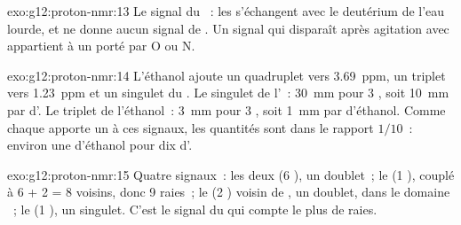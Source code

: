 \begin{solution}{exo:g12:proton-nmr:13}
Le signal du ~: les   s'échangent avec le
deutérium de l'eau lourde, et  ne donne aucun signal de .
Un signal qui disparaît après agitation avec  appartient à un
 porté par O ou N.
\end{solution}

\begin{solution}{exo:g12:proton-nmr:14}
L'éthanol ajoute un quadruplet vers \qty{3.69}{ppm}, un triplet vers
\qty{1.23}{ppm} et un singulet du . Le singulet de l'~:
\qty{30}{mm} pour 3 , soit \qty{10}{mm} par  d'. Le
triplet de l'éthanol~: \qty{3}{mm} pour 3 , soit \qty{1}{mm} par
 d'éthanol. Comme chaque  apporte un  à ces
signaux, les quantités sont dans le rapport $1/10$~: environ une
 d'éthanol pour dix d'.
\end{solution}

\begin{solution}{exo:g12:proton-nmr:15}
Quatre signaux~: les deux  (6 ), un doublet~; le 
(1 ), couplé à 6 + 2 = 8 voisins, donc 9 raies~; le  (2
) voisin de , un doublet, dans le domaine ~; le
 (1 ), un singulet. C'est le signal du  qui compte
le plus de raies.
\end{solution}

